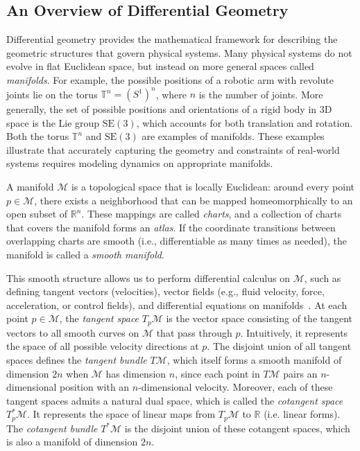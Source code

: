\documentclass{article}
\theoremstyle{plain}
\theoremstyle{definition}
\theoremstyle{remark}
\begin{document}
\subsection{An Overview of Differential Geometry}
Differential geometry \cite{Isham1989ModernDG,lee_smooth_manifolds} provides the mathematical framework for describing the geometric structures that govern physical systems.
Many physical systems do not evolve in flat Euclidean space, but instead on more general spaces called \emph{manifolds}.
For example, the possible positions of a robotic arm with revolute joints lie on the torus $\mathbb{T}^n = (S^1)^n$, where $n$ is the number of joints. 
More generally, the set of possible positions and orientations of a rigid body in 3D space is the Lie group $\mathrm{SE}(3)$, which accounts for both translation and rotation. 
Both the torus $\mathbb{T}^n$ and $\mathrm{SE}(3)$ are examples of manifolds.  These examples illustrate that accurately capturing the geometry and constraints of real-world systems requires modeling dynamics on appropriate manifolds.

A manifold $\mathcal{M}$ is a topological space that is locally Euclidean: around every point $p \in \mathcal{M}$, there exists a neighborhood that can be mapped homeomorphically to an open subset of $\mathbb{R}^n$.
These mappings are called \emph{charts}, and a collection of charts that covers the manifold forms an \emph{atlas}.
If the coordinate transitions between overlapping charts are smooth (i.e., differentiable as many times as needed), the manifold is called a \emph{smooth manifold}. 

This smooth structure allows us to perform differential calculus on $\mathcal{M}$, such as defining tangent vectors (velocities), vector fields (e.g., fluid velocity, force, acceleration, or control fields), and differential equations on manifolds~\cite{tu2020differential}. At each point $p \in \mathcal{M}$, the \emph{tangent space} $T_p\mathcal{M}$ is the vector space consisting of the tangent vectors to all smooth curves on $\mathcal{M}$ that pass through $p$. 
Intuitively, it represents the space of all possible velocity directions at $p$. The disjoint union of all tangent spaces defines the \emph{tangent bundle} $T\mathcal{M}$, which itself forms a smooth manifold of dimension $2n$ when $\mathcal{M}$ has dimension $n$, since each point in \( T\mathcal{M} \) pairs an \( n \)-dimensional position with an \( n \)-dimensional velocity. Moreover, each of these tangent spaces admits a natural dual space, which is called the \emph{cotangent space} $T^*_p\mathcal{M}$. It represents the space of linear maps from $T_p\mathcal{M}$ to $\mathbb{R}$ (i.e. linear forms). The \emph{cotangent bundle} $T^*\mathcal{M}$ is the disjoint union of these cotangent spaces, which is also a manifold of dimension $2n$.
\end{document}
